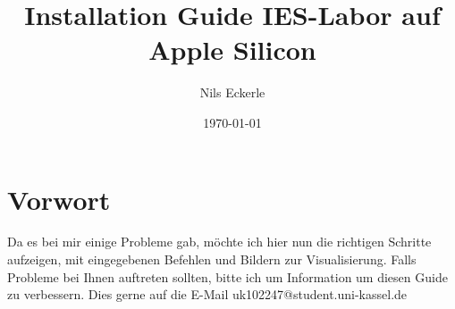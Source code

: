 
\usepackage{graphicx}
\usepackage{enumitem}   %
\usepackage{listings}   %
\usepackage{xcolor}     %
\usepackage{tcolorbox}  %
\usepackage{float}


\newcommand{\datei}[1]{\texttt{\textbf{#1}}}

\newcommand*\lxor{\ \dot{\vee}}
\newcommand{\nLeftright}{\mathrel{\ooalign{$\Leftrightarrow$\cr\hidewidth$/$\hidewidth}}}
\newcommand{\nleftright}{\mathrel{\ooalign{$\leftrightarrow$\cr\hidewidth$/$\hidewidth}}}
\newcommand{\email}{uk102247@student.uni-kassel.de}

\title{\vspace{-3.5cm}\huge \bf Installation Guide IES-Labor auf Apple Silicon}
\author{\vspace{-3mm}Nils Eckerle}
\date{\vspace{-6mm}\small\today}





\maketitle
\tableofcontents

\section{Vorwort}

Da es bei mir einige Probleme gab, möchte ich hier nun die richtigen Schritte aufzeigen, mit eingegebenen Befehlen und Bildern zur Visualisierung. 
Falls Probleme bei Ihnen auftreten sollten, bitte ich um Information um diesen Guide zu verbessern. 
Dies gerne auf die E-Mail \email

